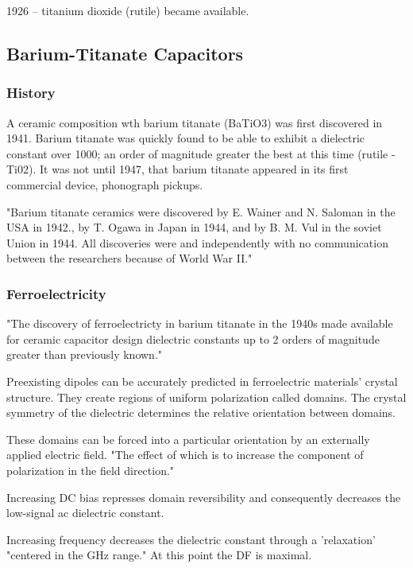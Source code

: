             1926 -- titanium dioxide (rutile) became available.\cite{deis_hist}

\subsection{Barium-Titanate Capacitors} \nocite{histFerr}
    \subsubsection{History}
        A ceramic composition wth barium titanate (BaTiO3) was first discovered in 1941. Barium titanate was quickly found to be able to exhibit a dielectric constant over 1000; an order of magnitude greater the best at this time (rutile - Ti02). It was not until 1947, that barium titanate appeared in its first commercial device, phonograph pickups.\cite{piezCer}

        "Barium titanate ceramics were discovered by E. Wainer and N. Saloman in the USA in 1942., by T. Ogawa in Japan in 1944, and by B. M. Vul in the soviet Union in 1944. All discoveries were and independently with no communication between the researchers because of World War II."\cite{hist_cerFilt}

    \subsubsection{Ferroelectricity}
        "The discovery of ferroelectricty in barium titanate in the 1940s made available for ceramic capacitor design dielectric constants up to 2 orders of magnitude greater than previously known."
        \cite[Ch 3 Sec III]{cerMaterials}

        Preexisting dipoles can be accurately predicted in ferroelectric materials' crystal structure. They create regions of uniform polarization called domains. The crystal symmetry of the dielectric determines the relative orientation between domains.

        These domains can be forced into a particular orientation by an externally applied electric field. "The effect of which is to increase the component of polarization in the field direction."

        Increasing DC bias represses domain reversibility and consequently decreases the low-signal ac dielectric constant.

        Increasing frequency decreases the dielectric constant through a 'relaxation' "centered in the GHz range." At this point the DF is maximal.
        \cite[Ch 3 Sec III]{cerMaterials}

